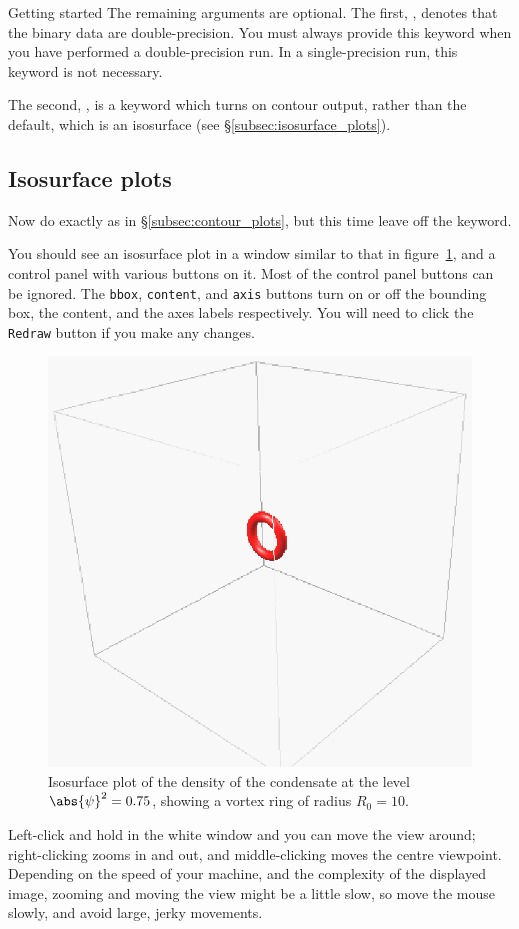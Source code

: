 \begin{chapter}{\label{cha:quickstart}Getting started}
  The remaining arguments are optional.  The first, , denotes that
  the binary data are double-precision.  You must always provide this keyword
  when you have performed a double-precision run.  In a single-precision run,
  this keyword is not necessary.

  The second, , is a keyword which turns on contour output,
  rather than the default, which is an isosurface (see
  \S\ref{subsec:isosurface_plots}).

  \subsection{\label{subsec:isosurface_plots}Isosurface plots}
  Now do exactly as in \S\ref{subsec:contour_plots}, but this time leave off
  the  keyword.
  
  You should see an isosurface plot in a window similar to that in
  figure~\ref{fig:ring_ic_iso}, and a control panel with various buttons on it.
  Most of the control panel buttons can be ignored.  The \verb"bbox",
  \verb"content", and \verb"axis" buttons turn on or off the bounding box, the
  content, and the axes labels respectively.  You will need to click the
  \verb"Redraw" button if you make any changes.
  \begin{figure}[h]
    \centering
    \includegraphics[scale=1]{fig/ring_ic_iso}
    \caption{\label{fig:ring_ic_iso}Isosurface plot of the density of the
      condensate at the level $\abs{\psi}^{2} = 0.75$, showing a vortex ring of
      radius $R_{0}=10$.}
  \end{figure}
  Left-click and hold in the white window and you can move the view around;
  right-clicking zooms in and out, and middle-clicking moves the centre
  viewpoint.  Depending on the speed of your machine, and the complexity of the
  displayed image, zooming and moving the view might be a little slow, so move
  the mouse slowly, and avoid large, jerky movements.


\end{chapter}
